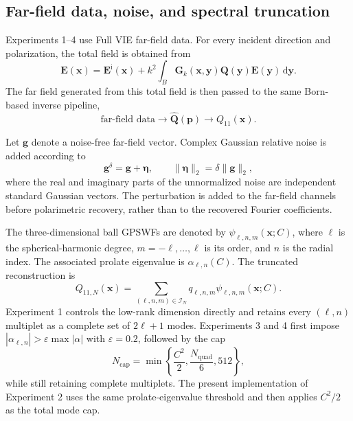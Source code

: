 \subsection{Far-field data, noise, and spectral truncation}
\label{subsec:maxwell-gpswf-data}

Experiments 1--4 use Full VIE far-field data. For every incident direction and
polarization, the total field is obtained from
\begin{equation}
    \mathbf{E}(\mathbf{x})
    =\mathbf{E}^{\mathrm{i}}(\mathbf{x})
    +k^2\int_B \mathbf{G}_k(\mathbf{x},\mathbf{y})
    \mathbf{Q}(\mathbf{y})\mathbf{E}(\mathbf{y})\,\mathrm{d}\mathbf{y}.
    \label{eq:maxwell-full-vie}
\end{equation}
The far field generated from this total field is then passed to the same
Born-based inverse pipeline,
\begin{equation}
    \text{far-field data}
    \longrightarrow \widehat{\mathbf{Q}}(\mathbf{p})
    \longrightarrow Q_{11}(\mathbf{x}).
    \label{eq:maxwell-inversion-pipeline}
\end{equation}

Let $\mathbf{g}$ denote a noise-free far-field vector. Complex Gaussian
relative noise is added according to
\begin{equation}
    \mathbf{g}^{\delta}=\mathbf{g}+\boldsymbol{\eta},
    \qquad
    \|\boldsymbol{\eta}\|_2=\delta\|\mathbf{g}\|_2,
    \label{eq:maxwell-noise}
\end{equation}
where the real and imaginary parts of the unnormalized noise are independent
standard Gaussian vectors. The perturbation is added to the far-field channels
before polarimetric recovery, rather than to the recovered Fourier
coefficients.

The three-dimensional ball GPSWFs are denoted by
$\psi_{\ell,n,m}(\mathbf{x};C)$, where $\ell$ is the spherical-harmonic degree,
$m=-\ell,\ldots,\ell$ is its order, and $n$ is the radial index. The associated
prolate eigenvalue is $\alpha_{\ell,n}(C)$. The truncated reconstruction is
\begin{equation}
    Q_{11,N}(\mathbf{x})
    =\sum_{(\ell,n,m)\in\mathcal{I}_N}
    q_{\ell,n,m}\psi_{\ell,n,m}(\mathbf{x};C).
    \label{eq:maxwell-gpswf-reconstruction}
\end{equation}
Experiment 1 controls the low-rank dimension directly and retains every
$(\ell,n)$ multiplet as a complete set of $2\ell+1$ modes. Experiments 3 and 4
first impose
$|\alpha_{\ell,n}|>\varepsilon\max|\alpha|$ with $\varepsilon=0.2$, followed by
the cap
\begin{equation}
    N_{\mathrm{cap}}
    =\min\left\{\frac{C^2}{2},\frac{N_{\mathrm{quad}}}{6},512\right\},
    \label{eq:maxwell-mode-cap}
\end{equation}
while still retaining complete multiplets. The present implementation of
Experiment 2 uses the same prolate-eigenvalue threshold and then applies
$C^2/2$ as the total mode cap.

